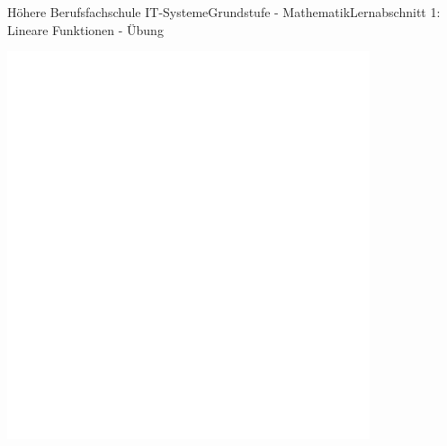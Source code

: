 \documentclass[oneside,openany,headings=optiontotoc,11pt,numbers=noenddot]{scrreprt}
\begin{document}
\begin{worksheet}{Höhere Berufsfachschule IT-Systeme}{Grundstufe - Mathematik}{Lernabschnitt 1: Lineare Funktionen - Übung}
\begin{framed}
			\includegraphics[width=0.8\textwidth]{../../empty.jpg}\\
		\end{framed}
		\newpage
		

\end{worksheet}
\end{document}
